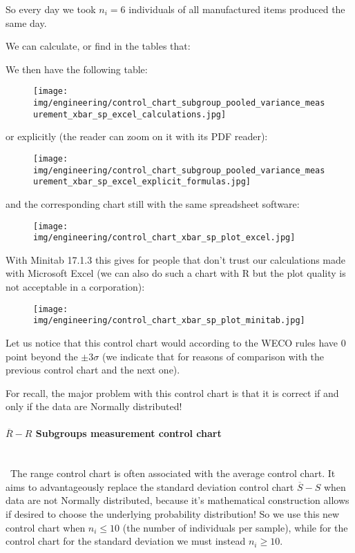 	So every day we took $n_i=6$ individuals of all manufactured items produced the same day.
	
	We can calculate, or find in the tables that:
	
	We then have the following table:
	\begin{figure}[H]
		\centering
		\texttt{[image: img/engineering/control\_chart\_subgroup\_pooled\_variance\_measurement\_xbar\_sp\_excel\_calculations.jpg]}
	\end{figure}
	or explicitly (the reader can zoom on it with its PDF reader):
	\begin{figure}[H]
		\centering
		\texttt{[image: img/engineering/control\_chart\_subgroup\_pooled\_variance\_measurement\_xbar\_sp\_excel\_explicit\_formulas.jpg]}
	\end{figure}
	and the corresponding chart still with the same spreadsheet software:
	\begin{figure}[H]
		\centering
		\texttt{[image: img/engineering/control\_chart\_xbar\_sp\_plot\_excel.jpg]}
	\end{figure}
	With Minitab 17.1.3 this gives for people that don't trust our calculations made with Microsoft Excel (we can also do such a chart with R but the plot quality is not acceptable in a corporation):
	\begin{figure}[H]
		\centering
		\texttt{[image: img/engineering/control\_chart\_xbar\_sp\_plot\_minitab.jpg]}
	\end{figure}
	Let us notice that this control chart would according to the WECO rules have $0$ point beyond the $\pm 3\sigma$ (we indicate that for reasons of comparison with the previous control chart and the next one). 
	
	For recall, the major problem with this control chart is that it is correct if and only if the data are Normally distributed!
	
	\paragraph{$\overline{R}-R$ Subgroups measurement control chart}\mbox{}\\\
	The range control chart is often associated with the average control chart. It aims to advantageously replace the standard deviation control chart $\overline {S}-S$ when data are not Normally distributed, because it's mathematical construction allows if desired to choose the underlying probability distribution! So we use this new control chart when $n_i\leq 10$ (the number of individuals per sample), while for the control chart for the standard deviation we must instead $n_i\geq 10$.
	
